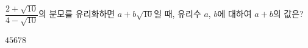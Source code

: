 $\dfrac{2+\sqrt{10}}{4-\sqrt{10}}$의 분모를 유리화하면 $a+b\sqrt{10}$일 때, 유리수 $a$, $b$에 대하여 $a+b$의 값은?
\begin{choices32}{$4$}{$5$}{$6$}{$7$}{$8$}\end{choices32}
